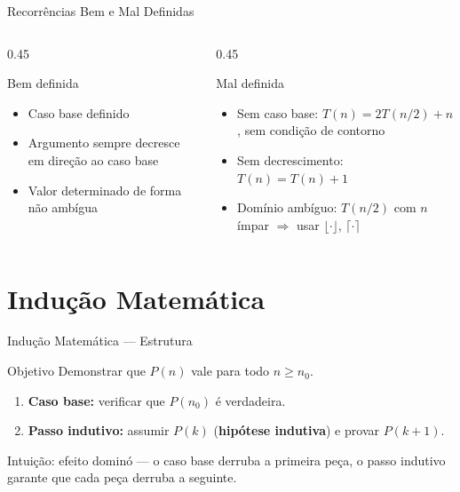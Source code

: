 \documentclass[aspectratio=169]{beamer}
\newcommand{\impt}[1]{\textcolor{maccent}{\textbf{#1}}}
\newcommand{\ntc}[1]{\textcolor{mprimary}{#1}}
\begin{document}
\begin{frame}{Recorrências Bem e Mal Definidas}
\begin{columns}[T]
\begin{column}{0.45\textwidth}
\begin{block}{Bem definida}
\begin{itemize}
    \item Caso base definido
    \item Argumento sempre decresce em direção ao caso base
    \item Valor determinado de forma não ambígua
\end{itemize}
\end{block}
\end{column}

\pause

\begin{column}{0.45\textwidth}
\begin{alertblock}{Mal definida}
\begin{itemize}
    \item Sem caso base: $T(n) = 2T(n/2) + n$, sem condição de contorno
    \item Sem decrescimento: $T(n) = T(n) + 1$
    \item Domínio ambíguo: $T(n/2)$ com $n$ ímpar $\Rightarrow$ usar $\lfloor\cdot\rfloor$, $\lceil\cdot\rceil$
\end{itemize}
\end{alertblock}
\end{column}
\end{columns}
\end{frame}

\section{Indução Matemática}

\begin{frame}{Indução Matemática --- Estrutura}
\begin{block}{Objetivo}
Demonstrar que $P(n)$ vale para todo $n \geq n_0$.
\end{block}

\vspace{0.3cm}
\pause

\begin{enumerate}
    \item \impt{Caso base:} verificar que $P(n_0)$ é verdadeira.
    \pause
    \item \impt{Passo indutivo:} assumir $P(k)$ (\textbf{hipótese indutiva}) e provar $P(k+1)$.
\end{enumerate}

\vspace{0.3cm}
\pause

\ntc{Intuição:} efeito dominó --- o caso base derruba a primeira peça, o passo indutivo garante que cada peça derruba a seguinte.
\end{frame}
\end{document}
